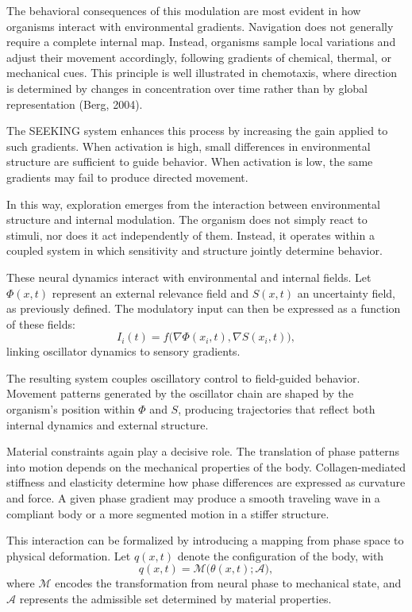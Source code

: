 \documentclass[11pt,oneside]{book}
\begin{document}
The behavioral consequences of this modulation are most evident in how organisms interact with environmental gradients. Navigation does not generally require a complete internal map. Instead, organisms sample local variations and adjust their movement accordingly, following gradients of chemical, thermal, or mechanical cues. This principle is well illustrated in chemotaxis, where direction is determined by changes in concentration over time rather than by global representation (Berg, 2004).

The SEEKING system enhances this process by increasing the gain applied to such gradients. When activation is high, small differences in environmental structure are sufficient to guide behavior. When activation is low, the same gradients may fail to produce directed movement.

In this way, exploration emerges from the interaction between environmental structure and internal modulation. The organism does not simply react to stimuli, nor does it act independently of them. Instead, it operates within a coupled system in which sensitivity and structure jointly determine behavior.

These neural dynamics interact with environmental and internal fields. Let $\Phi(x,t)$ represent an external relevance field and $S(x,t)$ an uncertainty field, as previously defined. The modulatory input can then be expressed as a function of these fields:
\[
I_i(t) = f\big(\nabla \Phi(x_i,t), \nabla S(x_i,t)\big),
\]
linking oscillator dynamics to sensory gradients.

The resulting system couples oscillatory control to field-guided behavior. Movement patterns generated by the oscillator chain are shaped by the organism’s position within $\Phi$ and $S$, producing trajectories that reflect both internal dynamics and external structure.

Material constraints again play a decisive role. The translation of phase patterns into motion depends on the mechanical properties of the body. Collagen-mediated stiffness and elasticity determine how phase differences are expressed as curvature and force. A given phase gradient may produce a smooth traveling wave in a compliant body or a more segmented motion in a stiffer structure.

This interaction can be formalized by introducing a mapping from phase space to physical deformation. Let $q(x,t)$ denote the configuration of the body, with
\[
q(x,t) = \mathcal{M}\big(\theta(x,t); \mathcal{A}\big),
\]
where $\mathcal{M}$ encodes the transformation from neural phase to mechanical state, and $\mathcal{A}$ represents the admissible set determined by material properties.
\end{document}
